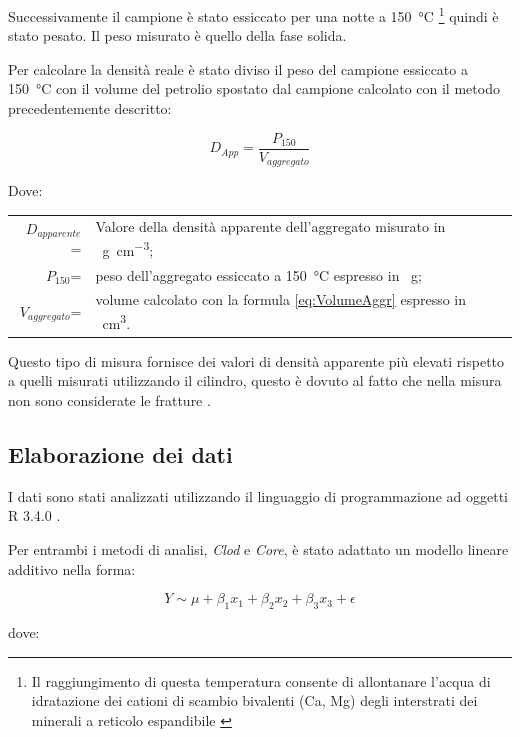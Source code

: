 \documentclass[11pt, a4paper, openright, titlepage, final, language = italian]{book}
\begin{document}
Successivamente il campione \`e stato essiccato per una notte a
\SI{150}{\degreeCelsius} \footnote{Il raggiungimento di questa
  temperatura consente di allontanare l'acqua di idratazione dei
  cationi di scambio bivalenti (Ca, Mg) degli interstrati dei minerali
  a reticolo espandibile \citep{Monnier_1973}} quindi \`e stato
pesato. Il peso misurato \`e quello della fase solida.


Per calcolare la densit\`a reale \`e stato diviso il peso del campione
essiccato a \SI{150}{\celsius} con il volume del petrolio spostato dal
campione calcolato con il metodo precedentemente descritto:

\begin{equation}
  \label{eq:densitapetrolio}
  D_{App} = \frac{P_{150}}{V_{aggregato}}
\end{equation}

Dove:\\
\begin{tabular}{rp{12cm}}
  $D_{apparente}$=  & Valore della densit\`a apparente dell'aggregato
                       misurato in \SI{}{\gram\per\cubic\cm};\\
  $P_{150}$=       & peso dell'aggregato essiccato a
                     \SI{150}{\celsius} espresso in \SI{}{\gram};\\
  $V_{aggregato}$=  & volume calcolato con la formula
                      \ref{eq:VolumeAggr} espresso in \SI{}{\cubic\cm}.
\end{tabular}

Questo tipo di misura fornisce dei valori di densit\`a apparente pi\`u
elevati rispetto a quelli misurati utilizzando il cilindro, questo \`e
dovuto al fatto che nella misura non sono considerate le fratture
\citep{tisdall1951comparison}.

\subsection{Elaborazione dei dati \label{modello}}
I dati sono stati analizzati utilizzando il linguaggio di
programmazione ad oggetti R 3.4.0 \citep{r_programming}.

Per entrambi i metodi di analisi, \emph{Clod} e \emph{Core}, \`e stato
adattato un modello lineare additivo nella forma:

\[
Y \sim \mu + \beta_1x_1 + \beta_2x_2 + \beta_3x_3 + \epsilon
\]

dove: \\ 
\end{document}
